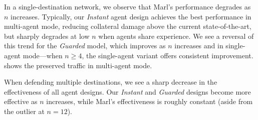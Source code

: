 \documentclass[10pt, times, comsoc]{IEEEtran}
\begin{document}
%	
%
%	
%
%	

In a single-destination network, we observe that Marl's performance degrades as $n$ increases.
Typically, our \emph{Instant} agent design achieves the best performance in multi-agent mode, reducing collateral damage above the current state-of-the-art, but sharply degrades at low $n$ when agents share experience.
We see a reversal of this trend for the \emph{Guarded} model, which improves as $n$ increases and in single-agent mode---when $n\ge4$, the single-agent variant offers consistent improvement.
 shows the preserved traffic in multi-agent mode.

When defending multiple destinations, we see a sharp decrease in the effectiveness of all agent designs.
Our \emph{Instant} and \emph{Guarded} designs become more effective as $n$ increases, while Marl's effectiveness is roughly constant (aside from the outlier at $n=12$).
\end{document}
